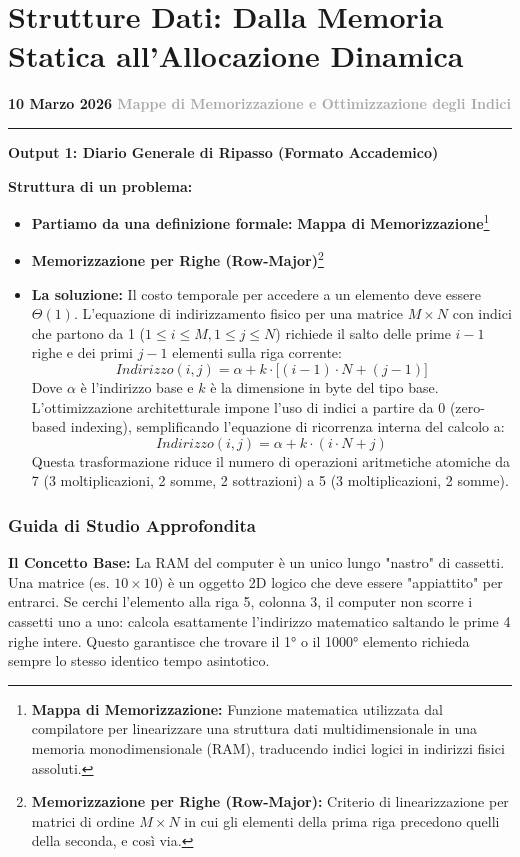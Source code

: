 \documentclass[a4paper, 11pt]{report}
\newcommand{\lezione}[2]{
\vspace{2em}
\noindent\textbf{\Large #1 \hfill \textcolor{darkgray}{#2}}
\vspace{0.5em}
\hrule
\vspace{1.5em}
}
\newcommand{\definizione}[2]{%
\textbf{#1}\footnote{\textbf{#1:} #2}%
}
\begin{document}
\chapter{Strutture Dati: Dalla Memoria Statica all'Allocazione Dinamica}

\lezione{10 Marzo 2026}{Mappe di Memorizzazione e Ottimizzazione degli Indici}

\vspace{0.5cm}
\textbf{Output 1: Diario Generale di Ripasso (Formato Accademico)}

\textbf{Struttura di un problema:}
\begin{itemize}
    \item \textbf{Partiamo da una definizione formale:} \definizione{Mappa di Memorizzazione}{Funzione matematica utilizzata dal compilatore per linearizzare una struttura dati multidimensionale in una memoria monodimensionale (RAM), traducendo indici logici in indirizzi fisici assoluti.}
    \item \definizione{Memorizzazione per Righe (Row-Major)}{Criterio di linearizzazione per matrici di ordine $M \times N$ in cui gli elementi della prima riga precedono quelli della seconda, e così via.}
    \item \textbf{La soluzione:} Il costo temporale per accedere a un elemento deve essere $\Theta(1)$. L'equazione di indirizzamento fisico per una matrice $M \times N$ con indici che partono da 1 ($1 \le i \le M, 1 \le j \le N$) richiede il salto delle prime $i-1$ righe e dei primi $j-1$ elementi sulla riga corrente:
    \[ Indirizzo(i, j) = \alpha + k \cdot \Big[ (i - 1) \cdot N + (j - 1) \Big] \]
    Dove $\alpha$ è l'indirizzo base e $k$ è la dimensione in byte del tipo base. L'ottimizzazione architetturale impone l'uso di indici a partire da 0 (zero-based indexing), semplificando l'equazione di ricorrenza interna del calcolo a:
    \[ Indirizzo(i, j) = \alpha + k \cdot (i \cdot N + j) \]
    Questa trasformazione riduce il numero di operazioni aritmetiche atomiche da 7 (3 moltiplicazioni, 2 somme, 2 sottrazioni) a 5 (3 moltiplicazioni, 2 somme).
\end{itemize}

\vspace{0.5cm}
\subsection*{Guida di Studio Approfondita}

\textbf{Il Concetto Base:} La RAM del computer è un unico lungo "nastro" di cassetti. Una matrice (es. $10 \times 10$) è un oggetto 2D logico che deve essere "appiattito" per entrarci. Se cerchi l'elemento alla riga 5, colonna 3, il computer non scorre i cassetti uno a uno: calcola esattamente l'indirizzo matematico saltando le prime 4 righe intere. Questo garantisce che trovare il 1° o il 1000° elemento richieda sempre lo stesso identico tempo asintotico.
\end{document}
